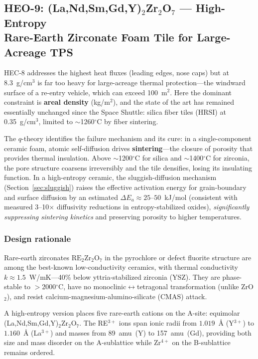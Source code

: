 \documentclass[12pt,letterpaper]{article}
\theoremstyle{definition}
\begin{document}
\subsection[HEO-9: High-Entropy Rare-Earth Zirconate Foam Tile]{HEO-9: (La,Nd,Sm,Gd,Y)$_2$Zr$_2$O$_7$ --- High-Entropy\\Rare-Earth Zirconate Foam Tile for Large-Acreage TPS}\label{sec:heo9}

HEC-8 addresses the highest heat fluxes (leading edges, nose caps) but at 8.3~g/cm$^3$ is far too heavy for large-acreage thermal protection---the windward surface of a re-entry vehicle, which can exceed 100~m$^2$.  Here the dominant constraint is \textbf{areal density} (kg/m$^2$), and the state of the art has remained essentially unchanged since the Space Shuttle: silica fiber tiles (HRSI) at 0.35~g/cm$^3$, limited to $\sim$1260$^\circ$C by fiber sintering.

The $q$-theory identifies the failure mechanism and its cure: in a single-component ceramic foam, atomic self-diffusion drives \textbf{sintering}---the closure of porosity that provides thermal insulation.  Above $\sim$1200$^\circ$C for silica and $\sim$1400$^\circ$C for zirconia, the pore structure coarsens irreversibly and the tile densifies, losing its insulating function.  In a high-entropy ceramic, the sluggish-diffusion mechanism (Section~\ref{sec:sluggish}) raises the effective activation energy for grain-boundary and surface diffusion by an estimated $\Delta E_a \approx 25$--$50$~kJ/mol (consistent with measured 3--10$\times$ diffusivity reductions in entropy-stabilized oxides), \emph{significantly suppressing sintering kinetics} and preserving porosity to higher temperatures.

\subsubsection{Design rationale}

Rare-earth zirconates $\mathrm{RE}_2\mathrm{Zr}_2\mathrm{O}_7$ in the pyrochlore or defect fluorite structure are among the best-known low-conductivity ceramics, with thermal conductivity $k \approx 1.5$~W/mK---40\% below yttria-stabilized zirconia (YSZ).  They are phase-stable to $>$2000$^\circ$C, have no monoclinic$\leftrightarrow$tetragonal transformation (unlike ZrO$_2$), and resist calcium-magnesium-alumino-silicate (CMAS) attack.

A high-entropy version places five rare-earth cations on the A-site: equimolar (La,\allowbreak{}Nd,\allowbreak{}Sm,\allowbreak{}Gd,\allowbreak{}Y)$_2$Zr$_2$O$_7$.  The RE$^{3+}$ ions span ionic radii from $1.019$~\AA{} (Y$^{3+}$) to $1.160$~\AA{} (La$^{3+}$) and masses from 89~amu~(Y) to 157~amu~(Gd), providing both size and mass disorder on the A-sublattice while Zr$^{4+}$ on the B-sublattice remains ordered.
\end{document}
